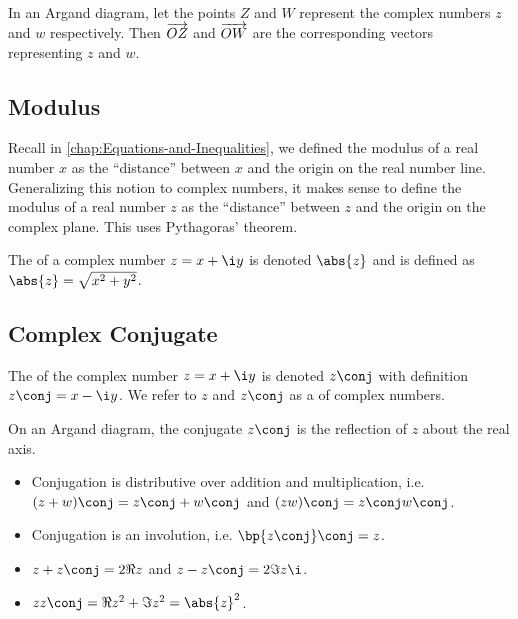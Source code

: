 In an Argand diagram, let the points $Z$ and $W$ represent the complex numbers $z$ and $w$ respectively. Then $\overrightarrow{OZ}$ and $\overrightarrow{OW}$ are the corresponding vectors representing $z$ and $w$.

\subsection{Modulus}

Recall in \SS\ref{chap:Equations-and-Inequalities}, we defined the modulus of a real number $x$ as the ``distance'' between $x$ and the origin on the real number line. Generalizing this notion to complex numbers, it makes sense to define the modulus of a real number $z$ as the ``distance'' between $z$ and the origin on the complex plane. This uses Pythagoras' theorem.

\begin{definition}
    The  of a complex number $z = x + \i y$ is denoted $\abs{z}$ and is defined as $\abs{z} = \sqrt{x^2 + y^2}$.
\end{definition}

\subsection{Complex Conjugate}

\begin{definition}
    The  of the complex number $z = x + \i y$ is denoted $z\conj$ with definition $z\conj = x - \i y$. We refer to $z$ and $z\conj$ as a  of complex numbers.
\end{definition}

On an Argand diagram, the conjugate $z\conj$ is the reflection of $z$ about the real axis.

\begin{fact}
    \phantom{.}
    \begin{itemize}
        \item Conjugation is distributive over addition and multiplication, i.e. $(z + w)\conj = z\conj + w\conj$ and $(zw)\conj = z\conj w\conj$.
        \item Conjugation is an involution, i.e. $\bp{z\conj}\conj = z$.
        \item $z + z\conj = 2\Re{z}$ and $z - z\conj = 2\Im{z} \i$.
        \item $z z\conj = \Re{z}^2 + \Im{z}^2 = \abs{z}^2$.
    \end{itemize}
\end{fact}

